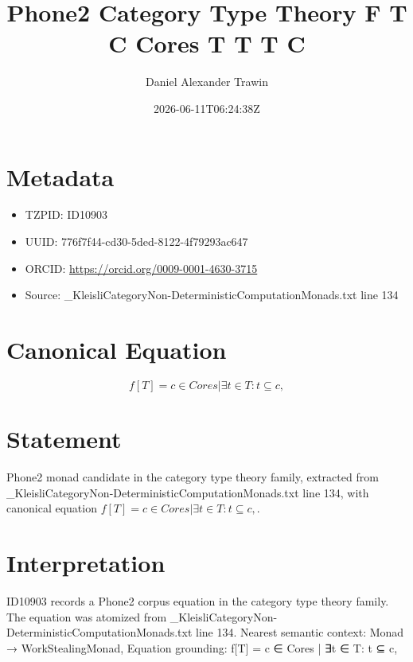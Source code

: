 \documentclass[11pt]{article}
\title{Phone2 Category Type Theory F T C Cores T T T C}
\author{Daniel Alexander Trawin}
\date{2026-06-11T06:24:38Z}
\begin{document}
\maketitle
\section*{Metadata}
\begin{itemize}
\item TZPID: ID10903
\item UUID: 776f7f44-cd30-5ded-8122-4f79293ac647
\item ORCID: \url{https://orcid.org/0009-0001-4630-3715}
\item Source: _KleisliCategoryNon-DeterministicComputationMonads.txt line 134
\end{itemize}
\section*{Canonical Equation}
\[
f[T] = {c ∈ Cores | ∃t ∈ T: t ⊆ c},
\]
\section*{Statement}
Phone2 monad candidate in the category type theory family, extracted from _KleisliCategoryNon-DeterministicComputationMonads.txt line 134, with canonical equation $f[T] = {c ∈ Cores | ∃t ∈ T: t ⊆ c},$.
\section*{Interpretation}
ID10903 records a Phone2 corpus equation in the category type theory family. The equation was atomized from _KleisliCategoryNon-DeterministicComputationMonads.txt line 134. Nearest semantic context: Monad → WorkStealingMonad, Equation grounding: f[T] = {c ∈ Cores | ∃t ∈ T: t ⊆ c},
\end{document}
